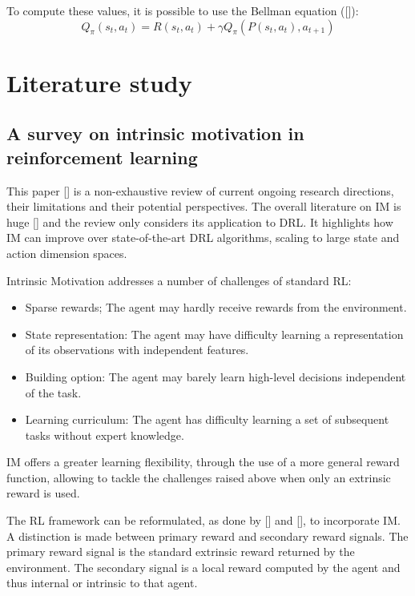 \documentclass[conference]{IEEEtran}
\begin{document}
To compute these values, it is possible to use the Bellman equation ([\cite{sutton2018reinforcement}]):
\begin{equation*}
    Q_{\pi}(s_t, a_t) = R(s_t, a_t) + \gamma Q_{\pi}(P(s_t, a_t), a_{t+1})
\end{equation*}

\section{Literature study} \label{sec:literature_study}

\subsection{A survey on intrinsic motivation in reinforcement learning}

This paper [\cite{aubret2019survey}] is a non-exhaustive review of current ongoing research directions, their limitations and their potential perspectives. The overall literature on IM is huge [\cite{barto2013intrinsic}] and the review only considers its application to DRL. It highlights how IM can improve over state-of-the-art DRL algorithms, scaling to large state and action dimension spaces.

Intrinsic Motivation addresses a number of challenges of standard RL:
\begin{itemize}
    \item Sparse rewards; The agent may hardly receive rewards from the environment.
    \item State representation: The agent may have difficulty learning a representation of its observations with independent features.
    \item Building option: The agent may barely learn high-level decisions independent of the task.
    \item Learning curriculum: The agent has difficulty learning a set of subsequent tasks without expert knowledge.
\end{itemize}

IM offers a greater learning flexibility, through the use of a more general reward function, allowing to tackle the challenges raised above when only an extrinsic reward is used.

The RL framework can be reformulated, as done by [\cite{singh2010intrinsically}] and [\cite{barto2004intrinsically}], to incorporate IM. A distinction is made between primary reward and secondary reward signals. The primary reward signal is the standard extrinsic reward returned by the environment. The secondary signal is a local reward computed by the agent and thus internal or intrinsic to that agent.
\end{document}

